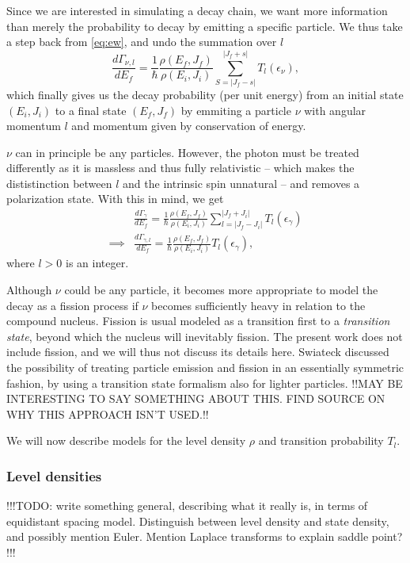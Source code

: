 Since we are interested in simulating a decay chain, we want more information than merely the probability to decay by emitting a specific particle. We thus take a step back from \eqref{eq:ew}, and undo the summation over $l$
\begin{equation}
\frac{d\Gamma_{\nu,l}}{dE_f} = \frac{1}{\hbar} \frac{\rho(E_f,J_f)}{\rho(E_i,J_i)} \sum_{S=|J_f-s|}^{|J_f+s|} T_l(\epsilon_\nu),\label{eq:ew}
\end{equation}
which finally gives us the decay probability (per unit energy) from an initial state $(E_i,J_i)$ to a final state $(E_f,J_f)$ by emmiting a particle $\nu$ with angular momentum $l$ and momentum given by conservation of energy.

$\nu$ can in principle be any particles. However, the photon must be treated differently as it is massless and thus fully relativistic -- which makes the dististinction between $l$ and the intrinsic spin unnatural -- and removes a polarization state. With this in mind, we get
\begin{align}
&\frac{d\Gamma_{\gamma}}{dE_f} = \frac{1}{\hbar} \frac{\rho(E_f,J_f)}{\rho(E_i,J_i)} \sum_{l=|J_f-J_i|}^{|J_f+J_i|} T_l(\epsilon_\gamma) \\
\implies & \frac{d\Gamma_{\gamma,l}}{dE_f} = \frac{1}{\hbar} \frac{\rho(E_f,J_f)}{\rho(E_i,J_i)} T_l(\epsilon_\gamma),\label{eq:gammagamma}
\end{align}
where $l>0$ is an integer.

Although $\nu$ could be any particle, it becomes more appropriate to model the decay as a fission process if $\nu$ becomes sufficiently heavy in relation to the compound nucleus. Fission is usual modeled as a transition first to a \emph{transition state}, beyond which the nucleus will inevitably fission\cite{krane:book}. The present work does not include fission, and we will thus not discuss its details here. Swiateck discussed the possibility of treating particle emission and fission in an essentially symmetric fashion, by using a transition state formalism also for lighter particles\cite{swiatecki:1983:art}. !!MAY BE INTERESTING TO SAY SOMETHING ABOUT THIS. FIND SOURCE ON WHY THIS APPROACH ISN'T USED.!!

We will now describe models for the level density $\rho$ and transition probability $T_l$.

\subsubsection{Level densities}
!!!TODO: write something general, describing what it really is, in terms of equidistant spacing model. Distinguish between level density and state density, and possibly mention Euler. Mention Laplace transforms to explain saddle point? !!!

